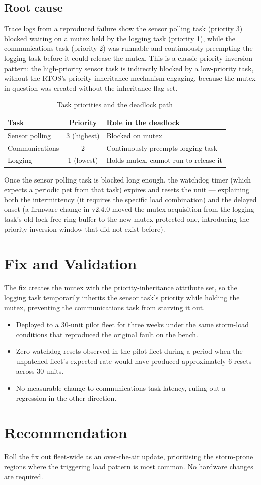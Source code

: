 \documentclass[11pt,a4paper]{article}
\begin{document}
\subsection{Root cause}

Trace logs from a reproduced failure show the sensor polling task
(priority 3) blocked waiting on a mutex held by the logging task
(priority 1), while the communications task (priority 2) was
runnable and continuously preempting the logging task before it
could release the mutex. This is a classic priority-inversion
pattern: the high-priority sensor task is indirectly blocked by a
low-priority task, without the RTOS's priority-inheritance mechanism
engaging, because the mutex in question was created without the
inheritance flag set.

\begin{table}[h]
\centering
\caption{Task priorities and the deadlock path}
\begin{tabular}{lcl}
\toprule
Task & Priority & Role in the deadlock \\
\midrule
Sensor polling & 3 (highest) & Blocked on mutex \\
Communications & 2 & Continuously preempts logging task \\
Logging & 1 (lowest) & Holds mutex, cannot run to release it \\
\bottomrule
\end{tabular}
\end{table}

Once the sensor polling task is blocked long enough, the watchdog
timer (which expects a periodic pet from that task) expires and
resets the unit --- explaining both the intermittency (it requires
the specific load combination) and the delayed onset (a firmware
change in v2.4.0 moved the mutex acquisition from the logging task's
old lock-free ring buffer to the new mutex-protected one, introducing
the priority-inversion window that did not exist before).

\section{Fix and Validation}

The fix creates the mutex with the priority-inheritance attribute
set, so the logging task temporarily inherits the sensor task's
priority while holding the mutex, preventing the communications task
from starving it out.

\begin{itemize}[leftmargin=1.4em]
    \item Deployed to a 30-unit pilot fleet for three weeks under the
    same storm-load conditions that reproduced the original fault on
    the bench.
    \item Zero watchdog resets observed in the pilot fleet during a
    period when the unpatched fleet's expected rate would have
    produced approximately 6 resets across 30 units.
    \item No measurable change to communications task latency, ruling
    out a regression in the other direction.
\end{itemize}

\section{Recommendation}

Roll the fix out fleet-wide as an over-the-air update, prioritising
the storm-prone regions where the triggering load pattern is most
common. No hardware changes are required.
\end{document}
